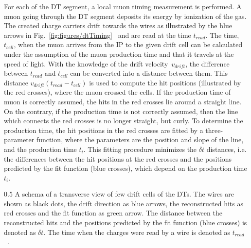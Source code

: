 For each of the DT segment, a local muon timing measurement is performed. A muon going through the DT segment deposits its energy by ionization of the gas. The created charge carriers drift towards the wires as illustrated by the blue arrows in Fig.~\ref{fig:figures/dtTiming}~\cite{Traczyk:1365029} and are read at the time $t_{read}$. The time, $t_{cell}$,  when the muon arrives from the IP to the given drift cell can be calculated under the assumption of the muon production time and that it travels at the speed of light. With the knowledge of the drift velocity~$v_{drift}$, the difference between $t_{read}$ and $t_{cell}$  can be converted into a distance between them. This distance $ v_{drift} (t_{read} - t_{cell})$  is used to compute the hit positions (illustrated by the red crosses), where the muon crossed the cells.  If the production time of muon is correctly assumed, the hits in the red crosses lie around a straight line. On the contrary, if the production time is not correctly assumed,  then the line which connects the red crosses is no longer straight, but curly. To determine the production time, the hit positions in the red crosses are fitted by a three-parameter function,  where the parameters are the position and slope of the line, and the production time $t_{i}$. This fitting procedure minimizes the $\delta t$ distances, i.e. the differences between the hit positions at the red crosses and the positions predicted by the fit function (blue crosses), which depend on the production time $t_{i}$. 


                 {0.5}       %
                 { A schema of a transverse view of few drift cells of the DTs. The wires are shown as black dots, the drift direction as blue arrows, the reconstructed hits as red crosses and the fit function as green arrow. The distance between the reconstructed hits and  the positions predicted by the fit function (blue crosses) is denoted as $\delta t$. The time when the charges were read by a wire is denoted as $t_{read}$~\cite{Traczyk:1365029}.  }

